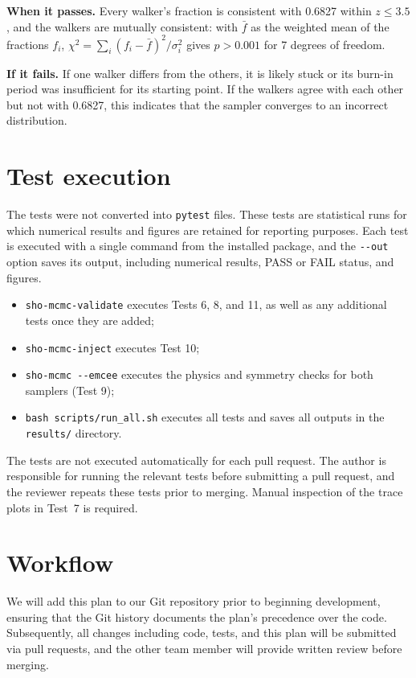 \documentclass[11pt]{article}
\begin{document}
\textbf{When it passes.} Every walker's fraction is consistent with 0.6827 within $z \le 3.5$, and the walkers are mutually consistent: with $\bar f$ as the weighted mean of the fractions $f_i$, $\chi^2 = \sum_i (f_i - \bar f)^2/\sigma_i^2$ gives $p > 0.001$ for 7 degrees of freedom.

\textbf{If it fails.} If one walker differs from the others, it is likely stuck or its burn-in period was insufficient for its starting point. If the walkers agree with each other but not with 0.6827, this indicates that the sampler converges to an incorrect distribution.

\section{Test execution}
The tests were not converted into \texttt{pytest} files. These tests are statistical runs for which numerical results and figures are retained for reporting purposes. Each test is executed with a single command from the installed package, and the \texttt{-{}-out} option saves its output, including numerical results, PASS or FAIL status, and figures.
\begin{itemize}
  \item \texttt{sho-mcmc-validate} executes Tests 6, 8, and 11, as well as any additional tests once they are added;
  \item \texttt{sho-mcmc-inject} executes Test 10;
  \item \texttt{sho-mcmc -{}-emcee} executes the physics and symmetry checks for both samplers (Test 9);
  \item \texttt{bash scripts/run\_all.sh} executes all tests and saves all outputs in the \texttt{results/} directory.
\end{itemize}
The tests are not executed automatically for each pull request. The author is responsible for running the relevant tests before submitting a pull request, and the reviewer repeats these tests prior to merging. Manual inspection of the trace plots in Test~7 is required.

\section{Workflow}
We will add this plan to our Git repository prior to beginning development, ensuring that the Git history documents the plan's precedence over the code. Subsequently, all changes including code, tests, and this plan will be submitted via pull requests, and the other team member will provide written review before merging.
\end{document}
